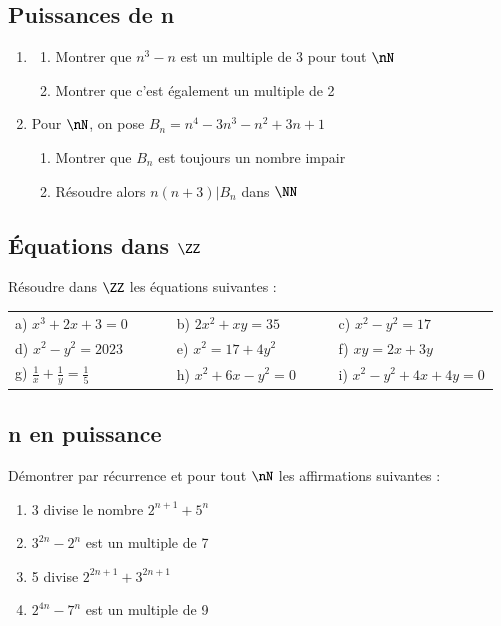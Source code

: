 \documentclass[oneside,12pt]{article}          %
\begin{document}
\subsection{Puissances de n}
\begin{enumerate}
    \item \begin{enumerate}
        \item Montrer que $n^3-n$ est un multiple de 3 pour tout $\nN$
        \item Montrer que c'est également un multiple de 2
    \end{enumerate}
    \item Pour $\nN$, on pose $B_n=n^4-3n^3-n^2+3n+1$
    \begin{enumerate}
        \item Montrer que $B_n$ est toujours un nombre impair
        \item Résoudre alors $n(n+3)\vert B_n$ dans $\NN$
    \end{enumerate}
\end{enumerate}



\subsection{Équations dans $\ZZ$}
Résoudre dans $\ZZ$ les équations suivantes :

\begin{tabular}{p{0.33\linewidth} p{0.33\linewidth} p{0.33\linewidth}}
    a) $x^3+2x+3=0$ & b) $2x^2+xy=35$ & c) $x^2-y^2=17$ \\
    d) $x^2-y^2=2023$ & e) $x^2=17+4y^2$ & f) $xy = 2x +3y$ \\
    g) $\frac{1}{x}+\frac{1}{y}=\frac{1}{5}$ & h) $x^2+6x-y^2=0$ & i) $x^2-y^2+4x+4y=0$ \\
\end{tabular}



\subsection{n en puissance}
Démontrer par récurrence et pour tout $\nN$ les affirmations suivantes :
\begin{enumerate}
    \item[a)] 3 divise le nombre $2^{n+1}+5^n$
    \item[b)] $3^{2n}-2^n$ est un multiple de 7
    \item[c)] 5 divise $2^{2n+1}+3^{2n+1}$
    \item[d)] $2^{4n}-7^n$ est un multiple de 9
\end{enumerate}
\end{document}
